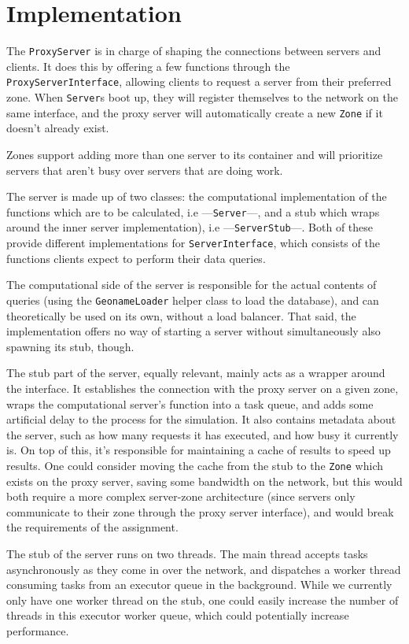 \documentclass{article}
\def\code#1{\colorbox{gray!20}{\texttt{#1}}}
\begin{document}
\section{Implementation}
The \code{ProxyServer} is in charge of shaping the connections between servers and clients. It does this by offering a few functions through the \code{ProxyServerInterface}, allowing clients to request a server from their preferred zone. When \code{Server}s boot up, they will register themselves to the network on the same interface, and the proxy server will automatically create a new \code{Zone} if it doesn't already exist.

Zones support adding more than one server to its container and will prioritize servers that aren't busy over servers that are doing work.

The server is made up of two classes: the computational implementation of the functions which are to be calculated, i.e ---\code{Server}---, and a stub which wraps around the inner server implementation), i.e ---\code{ServerStub}---. Both of these provide different implementations for \code{ServerInterface}, which consists of the functions clients expect to perform their data queries.

The computational side of the server is responsible for the actual contents of queries (using the \code{GeonameLoader} helper class to load the database), and can theoretically be used on its own, without a load balancer. That said, the implementation offers no way of starting a server without simultaneously also spawning its stub, though.

The stub part of the server, equally relevant, mainly acts as a wrapper around the interface. It establishes the connection with the proxy server on a given zone, wraps the computational server's function into a task queue, and adds some artificial delay to the process for the simulation. It also contains metadata about the server, such as how many requests it has executed, and how busy it currently is. On top of this, it's responsible for maintaining a cache of results to speed up results. One could consider moving the cache from the stub to the \code{Zone} which exists on the proxy server, saving some bandwidth on the network, but this would both require a more complex server-zone architecture (since servers only communicate to their zone through the proxy server interface), and would break the requirements of the assignment.

The stub of the server runs on two threads. The main thread accepts tasks asynchronously as they come in over the network, and dispatches a worker thread consuming tasks from an executor queue in the background. While we currently only have one worker thread on the stub, one could easily increase the number of threads in this executor worker queue, which could potentially increase performance.
\end{document}
